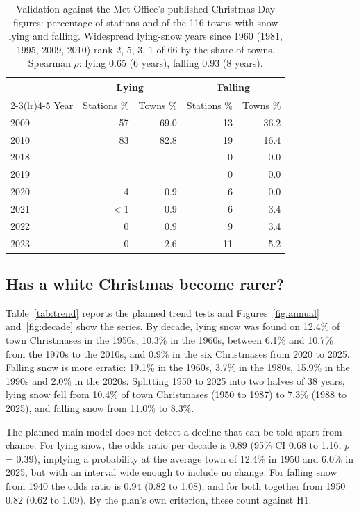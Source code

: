 \documentclass[11pt,a4paper]{article}
\begin{document}
\begin{table}[tbp]\centering\small\caption{Validation against the Met Office's published Christmas Day figures: percentage of stations and of the 116 towns with snow lying and falling. Widespread lying-snow years since 1960 (1981, 1995, 2009, 2010) rank 2, 5, 3, 1 of 66 by the share of towns. Spearman $\rho$: lying 0.65 (6 years), falling 0.93 (8 years).}\label{tab:valid}\begin{tabular}{lrrrr}\toprule & \multicolumn{2}{c}{Lying} & \multicolumn{2}{c}{Falling}\\\cmidrule(lr){2-3}\cmidrule(lr){4-5} Year & Stations \% & Towns \% & Stations \% & Towns \%\\\midrule
2009 & 57 & 69.0 & 13 & 36.2\\
2010 & 83 & 82.8 & 19 & 16.4\\
2018 &  &  & 0 & 0.0\\
2019 &  &  & 0 & 0.0\\
2020 & 4 & 0.9 & 6 & 0.0\\
2021 & $<$1 & 0.9 & 6 & 3.4\\
2022 & 0 & 0.9 & 9 & 3.4\\
2023 & 0 & 2.6 & 11 & 5.2\\
\bottomrule\end{tabular}\end{table}

\subsection{Has a white Christmas become rarer?}
Table~\ref{tab:trend} reports the planned trend tests and Figures~\ref{fig:annual} and~\ref{fig:decade} show the series. By decade, lying snow was found on 12.4\% of town Christmases in the 1950s, 10.3\% in the 1960s, between 6.1\% and 10.7\% from the 1970s to the 2010s, and 0.9\% in the six Christmases from 2020 to 2025. Falling snow is more erratic: 19.1\% in the 1960s, 3.7\% in the 1980s, 15.9\% in the 1990s and 2.0\% in the 2020s. Splitting 1950 to 2025 into two halves of 38 years, lying snow fell from 10.4\% of town Christmases (1950 to 1987) to 7.3\% (1988 to 2025), and falling snow from 11.0\% to 8.3\%.

The planned main model does not detect a decline that can be told apart from chance. For lying snow, the odds ratio per decade is 0.89 (95\% CI 0.68 to 1.16, $p$ = 0.39), implying a probability at the average town of 12.4\% in 1950 and 6.0\% in 2025, but with an interval wide enough to include no change. For falling snow from 1940 the odds ratio is 0.94 (0.82 to 1.08), and for both together from 1950 0.82 (0.62 to 1.09). By the plan's own criterion, these count against H1.
\end{document}
